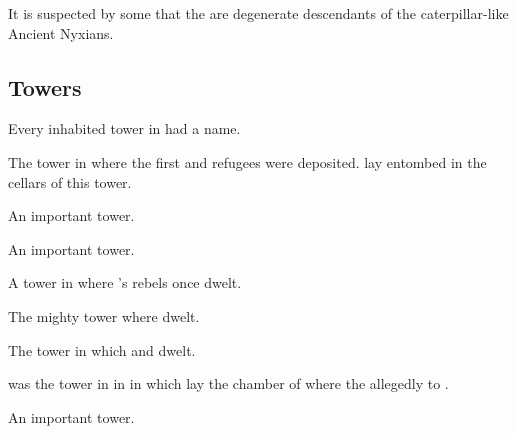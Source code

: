 It is suspected by some that the  are degenerate descendants of the caterpillar-like Ancient Nyxians. 










\subsection{Towers}
Every inhabited tower in \Nyx had a name. 





\begin{gloss}



  \gitem{\Jazerubel}
  The tower in  where the first \resphan and \nephil refugees were deposited.
  \Semiza lay entombed in the cellars of this tower. 



  \gitem{\Lamaruch}
  An important \Mystraacht tower.



  \gitem{\Roshmal}
  An important \Mystraacht tower.



  \gitem{\Sherem}
  A tower in \Merkyrah where 's rebels once dwelt.



  \gitem{\Shaiphon}
  The mighty tower where  dwelt.



  \gitem{\Tebethal}
  The tower in which  and  dwelt. 



  \gitem{\Tirunad}
  \Tirunad was the tower in  in  in which lay the chamber of  where the  allegedly  to .



  \gitem{\Tzarubal}
  An important \Mystraacht tower.



\end{gloss}









